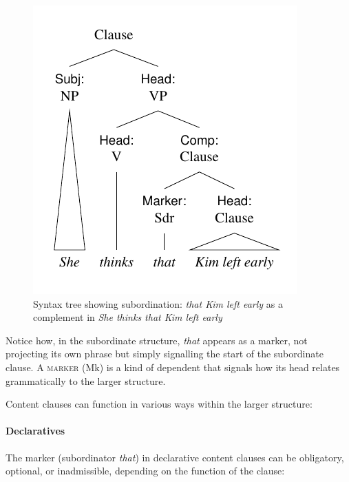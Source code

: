 \begin{figure}
    \centering
    \includegraphics[width=0.55\linewidth]{figures/she thinks that kim left.pdf}
    \caption{Syntax tree showing subordination: \textit{that Kim left early} as a complement in \textit{She thinks that Kim left early}}\label{fig:sub-tree-sub}
\end{figure}
    

Notice how, in the subordinate structure, \textit{that} appears as a marker, not projecting its own phrase but simply signalling the start of the subordinate clause. A \textsc{marker} (Mk) is a kind of dependent that signals how its head relates grammatically to the larger structure.

Content clauses can function in various ways within the larger structure:

\ea \label{ex:content-funcs}
    \z
\z

\paragraph*{Declaratives} The marker (subordinator \textit{that}) in declarative content clauses can be obligatory, optional, or inadmissible, depending on the function of the clause:
\ea\label{ex:marker-need}
\z\z

